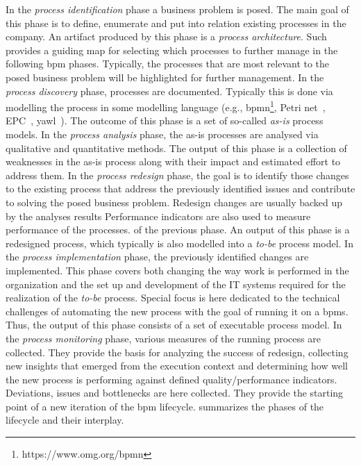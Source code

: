 In the \emph{process identification} phase a business problem is posed. The main goal of this phase is to define, enumerate and put into relation existing processes in the company. An artifact produced by this phase is a \emph{process architecture}. Such provides a guiding map for selecting which processes to further manage in the following \gls{bpm} phases. Typically, the processes that are most relevant to the posed business problem will be highlighted for further management.
In the \emph{process discovery} phase, processes are documented. Typically this is done via modelling the process in some modelling language (e.g., \gls{bpmn}\footnote{https://www.omg.org/bpmn}, Petri net~\citep{DBLP:journals/topnoc/LohmannVD09}, EPC~\citep{DBLP:books/wi/Dumas05/ScheerTA05}, \gls{yawl}~\citep{DBLP:journals/is/AalstH05}). The outcome of this phase is a set of so-called \emph{as-is} process models. 
In the \emph{process analysis} phase, the as-is processes are analysed via qualitative and quantitative methods. The output of this phase is a collection of weaknesses in the as-is process along with their impact and estimated effort to address them.
In the \emph{process redesign} phase, the goal is to identify those changes to the existing process that address the previously identified issues and contribute to solving the posed business problem. Redesign changes are usually backed up by the analyses results Performance indicators are also used to measure performance of the processes. of the previous phase. An output of this phase is a redesigned process, which typically is also modelled into a \emph{to-be} process model.
In the \emph{process implementation} phase, the previously identified changes are implemented. This phase covers both changing the way work is performed in the organization and the set up and development of the IT systems required for the realization of the \emph{to-be} process. Special focus is here dedicated to the technical challenges of automating the new process with the goal of running it on a \gls{bpms}. Thus, the output of this phase consists of a set of executable process model. 
In the \emph{process monitoring} phase, various measures of the running process are collected. They provide the basis for analyzing the success of redesign, collecting new insights that emerged from the execution context and determining how well the new process is performing against defined quality/performance indicators. Deviations, issues and bottlenecks are here collected. They provide the starting point of a new iteration of the \gls{bpm} lifecycle.
 summarizes the phases of the lifecycle and their interplay.

